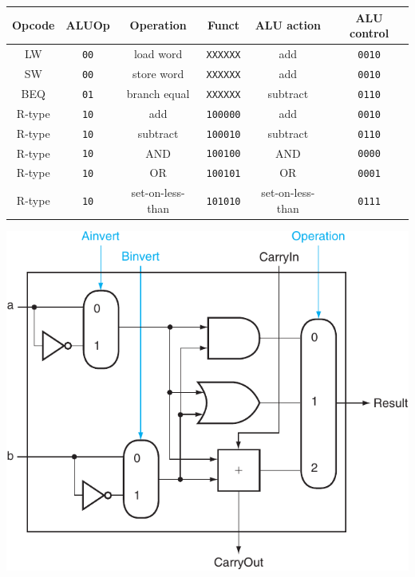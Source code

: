\documentclass[10pt]{article}
\begin{document}
\begin{minipage}{0.6\linewidth}
    \centering
    \begin{tabular}{cccccc}
        \toprule
        Opcode & ALUOp       & Operation        & Funct           & ALU action       & ALU control   \\
        \midrule
        LW     & \texttt{00} & load word        & \texttt{XXXXXX} & add              & \texttt{0010} \\
        SW     & \texttt{00} & store word       & \texttt{XXXXXX} & add              & \texttt{0010} \\
        BEQ    & \texttt{01} & branch equal     & \texttt{XXXXXX} & subtract         & \texttt{0110} \\
        R-type & \texttt{10} & add              & \texttt{100000} & add              & \texttt{0010} \\
        R-type & \texttt{10} & subtract         & \texttt{100010} & subtract         & \texttt{0110} \\
        R-type & \texttt{10} & AND              & \texttt{100100} & AND              & \texttt{0000} \\
        R-type & \texttt{10} & OR               & \texttt{100101} & OR               & \texttt{0001} \\
        R-type & \texttt{10} & set-on-less-than & \texttt{101010} & set-on-less-than & \texttt{0111} \\
        \bottomrule
    \end{tabular}
\end{minipage}
\hfill
\begin{minipage}{0.36\linewidth}
    \includegraphics[scale=0.8]{content/alu.pdf}
\end{minipage}

\vfill
\end{document}

